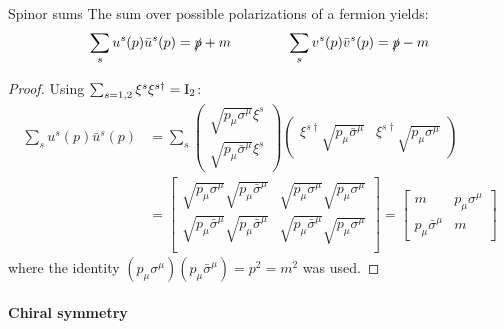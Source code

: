 \begin{proposition}{Spinor sums}{}
  The sum over possible polarizations of a fermion yields:
  \begin{equation}
    \sum_s u^s(p) \bar{u}^s(p) = \slashed{p} + m
    \qquad \qquad
    \sum_s v^s(p) \bar{v}^s(p) = \slashed{p} - m
  \end{equation}
\end{proposition}

\begin{proofbox}
  \begin{proof}
    Using $ \sum_{s = 1,2} \xi^s \xi^{s \dagger} = \mathrm{I}_2 $:
    \begin{equation*}
      \begin{split}
        \sum_s u^s(p) \bar{u}^s(p)
        &= \sum_s
        \begin{pmatrix} \sqrt{p_\mu \sigma^\mu} \xi^s \\ \sqrt{p_\mu \bar{\sigma}^\mu} \xi^s \end{pmatrix}
        \begin{pmatrix} \xi^{s \dagger} \sqrt{p_\mu \bar{\sigma}^\mu} & \xi^{s \dagger} \sqrt{p_\mu \sigma^\mu} \end{pmatrix} \\
        &=
        \begin{bmatrix}
          \sqrt{p_\mu \sigma^\mu} \sqrt{p_\mu \bar{\sigma}^\mu} & \sqrt{p_\mu \sigma^\mu} \sqrt{p_\mu \sigma^\mu} \\
          \sqrt{p_\mu \bar{\sigma}^\mu} \sqrt{p_\mu \bar{\sigma}^\mu} & \sqrt{p_\mu \bar{\sigma}^\mu} \sqrt{p_\mu \sigma^\mu} \\
        \end{bmatrix}
        =
        \begin{bmatrix}
          m & p_\mu \sigma^\mu \\ p_\mu \bar{\sigma}^\mu & m
        \end{bmatrix}
      \end{split}
    \end{equation*}
    where the identity $ (p_\mu \sigma^\mu) (p_\mu \bar{\sigma}^\mu) = p^2 = m^2 $ was used.
  \end{proof}
\end{proofbox}

\paragraph{Chiral symmetry}

